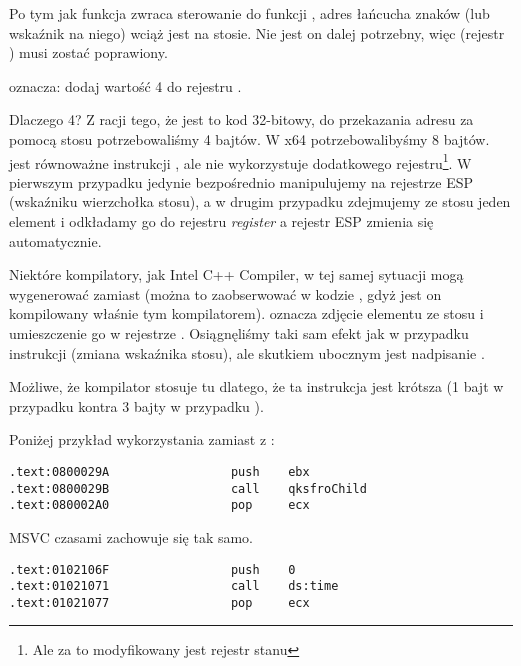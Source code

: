 Po tym jak funkcja \printf zwraca sterowanie do funkcji \main, adres łańcucha znaków (lub wskaźnik na niego) wciąż jest na stosie.
Nie jest on dalej potrzebny, więc  (rejestr \ESP) musi zostać poprawiony.

 oznacza: dodaj wartość 4 do rejestru \ESP.

Dlaczego 4? Z racji tego, że jest to kod 32-bitowy, do przekazania adresu za pomocą stosu potrzebowaliśmy 4 bajtów. W x64 potrzebowalibyśmy 8 bajtów.\\
 jest równoważne instrukcji , ale nie wykorzystuje dodatkowego rejestru\footnote{Ale za to modyfikowany jest rejestr stanu}. W pierwszym przypadku jedynie bezpośrednio manipulujemy na rejestrze ESP (wskaźniku wierzchołka stosu), a w drugim przypadku zdejmujemy ze stosu jeden element i odkładamy go do rejestru \emph{register} a rejestr ESP zmienia się automatycznie.

\myindex{\oracle}

Niektóre kompilatory, jak Intel C++ Compiler, w tej samej sytuacji mogą wygenerować  zamiast \ADD (można to zaobserwować w kodzie \oracle{}, gdyż jest on kompilowany właśnie tym kompilatorem).
 oznacza zdjęcie elementu ze stosu i umieszczenie go w rejestrze \ECX.
Osiągnęliśmy taki sam efekt jak w przypadku instrukcji \ADD (zmiana wskaźnika stosu), ale skutkiem ubocznym jest nadpisanie \ECX.

Możliwe, że kompilator stosuje tu  dlatego, że ta instrukcja jest krótsza (1 bajt w przypadku  kontra 3 bajty w przypadku ).

Poniżej przykład wykorzystania \POP zamiast \ADD z \oracle{}:

\begin{lstlisting}[caption=\oracle 10.2 Linux (plik app.o),style=customasmx86]
.text:0800029A                 push    ebx
.text:0800029B                 call    qksfroChild
.text:080002A0                 pop     ecx
\end{lstlisting}

MSVC czasami zachowuje się tak samo.

\begin{lstlisting}[caption=Saper na systemie Windows 7 32-bit]
.text:0102106F                 push    0
.text:01021071                 call    ds:time
.text:01021077                 pop     ecx
\end{lstlisting}

